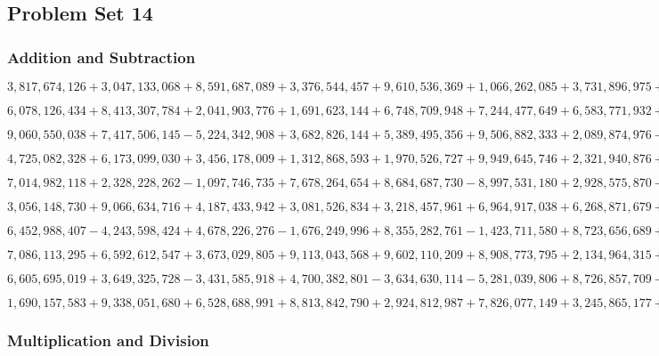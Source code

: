 \hypertarget{problem-set-14-6}{%
\subsection{Problem Set 14}\label{problem-set-14-6}}

\hypertarget{addition-and-subtraction-394}{%
\subsubsection{Addition and
Subtraction}\label{addition-and-subtraction-394}}

\(3,817,674,126+3,047,133,068+8,591,687,089+3,376,544,457+9,610,536,369+1,066,262,085+3,731,896,975+3,501,644,605+4,280,503,730+8,486,529,864\)

\(6,078,126,434+8,413,307,784+2,041,903,776+1,691,623,144+6,748,709,948+7,244,477,649+6,583,771,932+1,445,267,261+5,900,343,157+9,737,962,734\)

\(9,060,550,038+7,417,506,145-5,224,342,908+3,682,826,144+5,389,495,356+9,506,882,333+2,089,874,976-9,839,027,449-6,057,427,573-1,864,358,553\)

\(4,725,082,328+6,173,099,030+3,456,178,009+1,312,868,593+1,970,526,727+9,949,645,746+2,321,940,876+9,569,134,721+1,356,005,503+7,786,114,362\)

\(7,014,982,118+2,328,228,262-1,097,746,735+7,678,264,654+8,684,687,730-8,997,531,180+2,928,575,870-4,491,137,318-5,586,707,699+3,319,953,300\)

\(3,056,148,730+9,066,634,716+4,187,433,942+3,081,526,834+3,218,457,961+6,964,917,038+6,268,871,679+1,631,680,959+9,839,863,256+3,091,455,443\)

\(6,452,988,407-4,243,598,424+4,678,226,276-1,676,249,996+8,355,282,761-1,423,711,580+8,723,656,689+1,864,220,577-2,333,922,037+3,304,740,707\)

\(7,086,113,295+6,592,612,547+3,673,029,805+9,113,043,568+9,602,110,209+8,908,773,795+2,134,964,315+7,336,332,980+6,027,442,138+9,540,433,274\)

\(6,605,695,019+3,649,325,728-3,431,585,918+4,700,382,801-3,634,630,114-5,281,039,806+8,726,857,709-3,094,374,454+1,950,379,963+9,864,913,668\)

\(1,690,157,583+9,338,051,680+6,528,688,991+8,813,842,790+2,924,812,987+7,826,077,149+3,245,865,177+6,546,102,101+2,001,374,823+9,504,595,347\)

\hypertarget{multiplication-and-division-392}{%
\subsubsection{Multiplication and
Division}\label{multiplication-and-division-392}}

